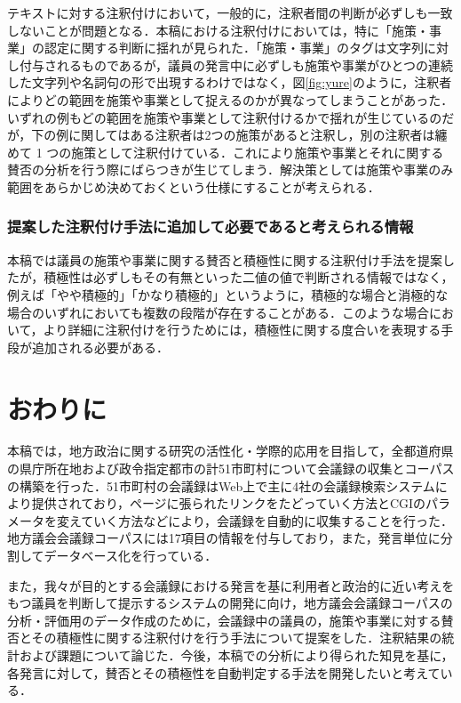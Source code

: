 \documentclass[japanese]{jnlp_1.4}
\begin{document}
テキストに対する注釈付けにおいて，一般的に，注釈者間の判断が必ずしも一致しないことが問題となる．本稿における注釈付けにおいては，特に「施策・事業」の認定に関する判断に揺れが見られた．「施策・事業」のタグは文字列に対し付与されるものであるが，議員の発言中に必ずしも施策や事業がひとつの連続した文字列や名詞句の形で出現するわけではなく，図\ref{fig:yure}のように，注釈者によりどの範囲を施策や事業として捉えるのかが異なってしまうことがあった．いずれの例もどの範囲を施策や事業として注釈付けるかで揺れが生じているのだが，下の例に関してはある注釈者は2つの施策があると注釈し，別の注釈者は纏めて 1 つの施策として注釈付けている．これにより施策や事業とそれに関する賛否の分析を行う際にばらつきが生じてしまう．解決策としては施策や事業のみ範囲をあらかじめ決めておくという仕様にすることが考えられる．


\subsubsection{提案した注釈付け手法に追加して必要であると考えられる情報}

本稿では議員の施策や事業に関する賛否と積極性に関する注釈付け手法を提案したが，積極性は必ずしもその有無といった二値の値で判断される情報ではなく，例えば「やや積極的」「かなり積極的」というように，積極的な場合と消極的な場合のいずれにおいても複数の段階が存在することがある．このような場合において，より詳細に注釈付けを行うためには，積極性に関する度合いを表現する手段が追加される必要がある．


\section{おわりに}

本稿では，地方政治に関する研究の活性化・学際的応用を目指して，全都道府県の県庁所在地および政令指定都市の計51市町村について会議録の収集とコーパスの構築を行った．51市町村の会議録はWeb上で主に4社の会議録検索システムにより提供されており，ページに張られたリンクをたどっていく方法とCGIのパラメータを変えていく方法などにより，会議録を自動的に収集することを行った．地方議会会議録コーパスには17項目の情報を付与しており，また，発言単位に分割してデータベース化を行っている．

また，我々が目的とする会議録における発言を基に利用者と政治的に近い考えをもつ議員を判断して提示するシステムの開発に向け，地方議会会議録コーパスの分析・評価用のデータ作成のために，会議録中の議員の，施策や事業に対する賛否とその積極性に関する注釈付けを行う手法について提案をした．注釈結果の統計および課題について論じた．今後，本稿での分析により得られた知見を基に，各発言に対して，賛否とその積極性を自動判定する手法を開発したいと考えている．
\end{document}
